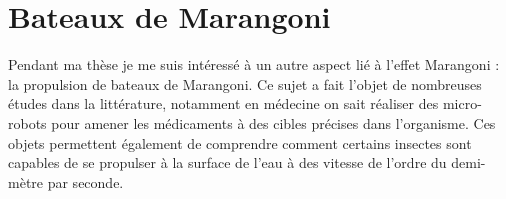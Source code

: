 \documentclass[french, 10pt]{article}
\begin{document}
% 
% 
% 

% 
\section{Bateaux de Marangoni}


Pendant ma thèse je me suis intéressé à un autre aspect lié à l'effet Marangoni : la propulsion de bateaux de Marangoni. Ce sujet a fait l'objet de nombreuses études dans la littérature, notamment en médecine on sait réaliser des micro-robots pour amener les médicaments à des cibles précises dans l'organisme. Ces objets permettent également de comprendre comment certains insectes sont capables de se propulser à la surface de l'eau à des vitesse de l'ordre du demi-mètre par seconde. 
\end{document}
